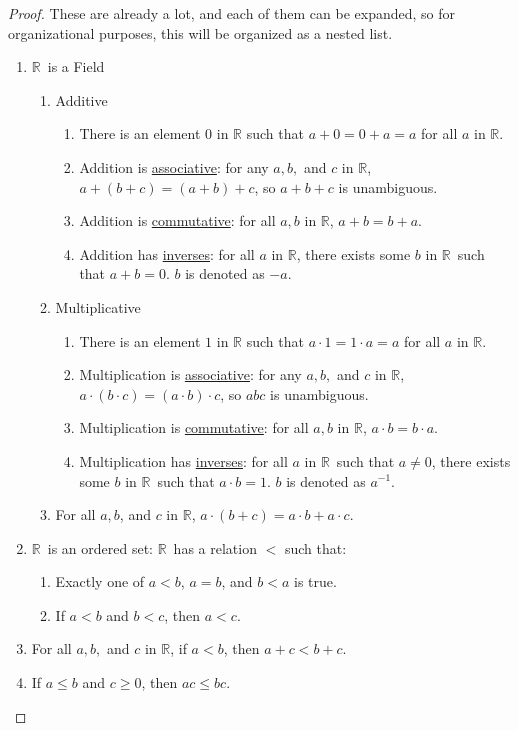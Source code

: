\documentclass[11pt]{article}
\newcommand{\mbbR}{\ensuremath{\mathbb{R}}}
\begin{document}
\begin{proof}
    These are already a lot, and each of them can be expanded, so for organizational purposes, this will be organized as a nested list.
    \begin{enumerate}
        \item   \mbbR\ is a Field
        \begin{enumerate}
            \item   Additive
            \begin{enumerate}
                \item   There is an element $0$ in $\mathbb{R}$ such that $a + 0 = 0 + a = a$ for all $a$ in $\mathbb{R}$.
                \item   Addition is \underline{associative}: for any $a, b,$ and $c$ in $\mathbb{R}$, $a + (b + c) = (a + b) + c$, so $a + b + c$ is unambiguous.
                \item   Addition is \underline{commutative}: for all $a, b$ in $\mathbb{R}$, $a + b = b + a$.
                \item   Addition has \underline{inverses}: for all $a$ in \mbbR, there exists some $b$ in \mbbR\ such that $a + b = 0$. $b$ is denoted as $-a$.
            \end{enumerate}
            \item   Multiplicative
            \begin{enumerate}
                \item   There is an element $1$ in $\mathbb{R}$ such that $a \cdot 1 = 1 \cdot a = a$ for all $a$ in $\mathbb{R}$.
                \item   Multiplication is \underline{associative}: for any $a, b,$ and $c$ in $\mathbb{R}$, $a \cdot (b \cdot c) = (a \cdot b) \cdot c$, so $a b c$ is unambiguous.
                \item   Multiplication is \underline{commutative}: for all $a, b$ in $\mathbb{R}$, $a \cdot b = b \cdot a$.
                \item   Multiplication has \underline{inverses}: for all $a$ in \mbbR\ such that $a \neq 0$, there exists some $b$ in \mbbR\ such that $a \cdot b = 1$. $b$ is denoted as $a^{-1}$.
            \end{enumerate}
            \item   For all $a, b$, and $c$ in \mbbR, $a \cdot (b + c) = a \cdot b + a \cdot c$.
        \end{enumerate}
        \item   \mbbR\ is an ordered set: \mbbR\ has a relation $<$ such that:
        \begin{enumerate}
            \item   Exactly one of $a < b$, $a = b$, and $b < a$ is true.
            \item   If $a < b$ and $b < c$, then $a < c$.
        \end{enumerate}
        \item   For all $a, b,$ and $c$ in $\mathbb{R}$, if $a < b$, then $a + c < b + c$.
        \item   If $a \leq b$ and $c \geq 0$, then $ac \leq bc$.
    \end{enumerate}


\end{proof}
\end{document}
